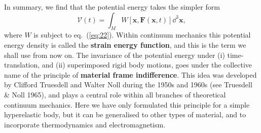 In summary, we find that the potential energy takes the simpler form
\begin{equation}
\mathcal{V}(t)=\int_{M}W[\mathbf{x},\mathbf{F}(\mathbf{x},t)]\dd^{3}\mathbf{x},
\label{eq:23}
\end{equation}
where $W$ is subject to eq.~(\ref{eq:22}). Within continuum mechanics this potential energy density is called the 
\textbf{strain energy function}, and this is the term we shall use from now on. The invariance of the potential energy under (i) time-translation, 
and (ii) superimposed rigid body motions, goes under the collective name of the principle of \textbf{material frame indifference}. This 
idea was developed by Clifford Truesdell and Walter Noll during the 1950s and 1960s (see Truesdell \& Noll 1965), and plays a central role within all branches of theoretical continuum 
mechanics. Here we have only formulated this principle for a simple hyperelastic body, but it can be generalised to other types 
of material, and to incorporate thermodynamics and electromagnetism.

